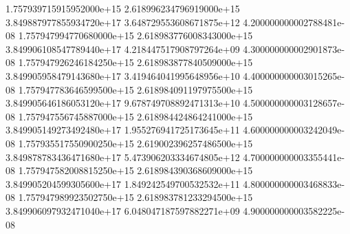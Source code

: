\documentclass{article}
\begin{document}
{1.757939715915952000e+15 2.618996234796919000e+15 3.849887977855934720e+17 3.648729553608671875e+12 4.200000000002788481e-08
1.757947994770680000e+15 2.618983776008343000e+15 3.849906108547789440e+17 4.218447517908797264e+09 4.300000000002901873e-08
1.757947926246184250e+15 2.618983877840509000e+15 3.849905958479143680e+17 3.419464041995648956e+10 4.400000000003015265e-08
1.757947783646599500e+15 2.618984091197975500e+15 3.849905646186053120e+17 9.678749708892471313e+10 4.500000000003128657e-08
1.757947556745887000e+15 2.618984424864241000e+15 3.849905149273492480e+17 1.955276941725173645e+11 4.600000000003242049e-08
1.757935517550900250e+15 2.619002396257486500e+15 3.849878783436471680e+17 5.473906203334674805e+12 4.700000000003355441e-08
1.757947582008815250e+15 2.618984390368609000e+15 3.849905204599305600e+17 1.849242549700532532e+11 4.800000000003468833e-08
1.757947989923502750e+15 2.618983781233294500e+15 3.849906097932471040e+17 6.048047187597882271e+09 4.900000000003582225e-08
}\datatable
\center
\pgfplotstabletypeset[
    columns/0/.style={
        column name=$Temperature$,
        dec sep align,
        /pgf/number format/fixed zerofill,
        /pgf/number format/precision=3
    },
    columns/1/.style={
        column name=$Total Energy$,  %
        dec sep align,      %
        /pgf/number format/fixed zerofill,  %
        /pgf/number format/precision=3     %
    },
    columns/2/.style={
        column name=$Kinetic Energy$,
        /pgf/number format/precision=3
    },
    columns/3/.style={
        column name=$Potential Energy$,
        /pgf/number format/fixed zerofill,
        /pgf/number format/precision=3
    },
       columns/4/.style={
        column name=$Time (s)$,
        dec sep align,
        /pgf/number format/precision=3
    },
    every head row/.style={
        before row=\toprule,    %
        after row=\midrule
    },
    every last row/.style={
        after row=\bottomrule
    }]{\datatable}
\end{document}
